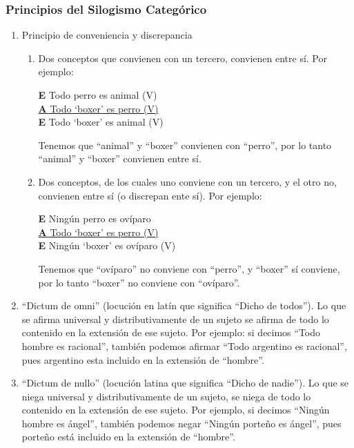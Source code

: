 \documentclass{article}
\begin{document}
 \subsubsection{Principios del Silogismo Categórico}
 \begin{enumerate}
     \item Principio de conveniencia y discrepancia
     \begin{enumerate}
         \item Dos conceptos que convienen con un tercero, convienen entre sí. Por ejemplo:
         \begin{center}
             \textbf{E} Todo perro es animal (V) \\
             \underline{\textbf{A} Todo `boxer' es perro (V)} \\
             \textbf{E} Todo `boxer' es animal (V) \\
         \end{center}
         Tenemos que ``animal'' y ``boxer'' convienen con ``perro'', por lo tanto ``animal'' y ``boxer'' convienen entre sí.
    \item Dos conceptos, de los cuales uno conviene con un tercero, y el otro no, convienen entre sí (o discrepan ente sí). Por ejemplo:
    
    \begin{center}
             \textbf{E} Ningún perro es ovíparo \\
             \underline{\textbf{A} Todo `boxer' es perro (V)} \\
             \textbf{E} Ningún `boxer' es ovíparo (V) \\
    \end{center}
    
    Tenemos que ``ovíparo'' no conviene con ``perro'', y ``boxer'' sí conviene, por lo tanto ``boxer'' no conviene con ``ovíparo''.
     \end{enumerate}
     
    \item ``Dictum de omni'' (locución en latín que significa ``Dicho de todos''). Lo que se afirma universal y distributivamente de un sujeto se afirma de todo lo contenido en la extensión de ese sujeto.
    Por ejemplo: si decimos ``Todo hombre es racional'', también podemos afirmar ``Todo argentino es racional'', pues argentino esta incluido en la extensión de ``hombre''.
    
    \item ``Dictum de nullo'' (locución latina que significa ``Dicho de nadie''). Lo que se niega universal y  distributivamente de un sujeto, se niega de todo lo contenido en la extensión de ese sujeto.
    Por ejemplo, si decimos ``Ningún hombre es ángel'', también podemos negar ``Ningún porteño es ángel'', pues porteño está incluido en la extensión de ``hombre''.
 \end{enumerate}
 
\end{document}
